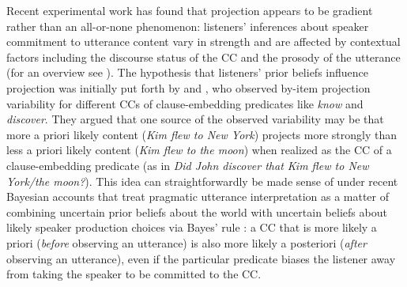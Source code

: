 \documentclass[11pt,fleqn]{article}
\newcommand{\6}{\mbox{$[\hspace*{-.6mm}[$}}
\newcommand{\9}{\mbox{$]\hspace*{-.6mm}]$}}
\begin{document}
Recent experimental work has found that projection appears to be gradient rather than an all-or-none phenomenon: listeners' inferences about speaker commitment to utterance content vary in strength and are affected by contextual factors including the discourse status of the CC and the prosody of the utterance (for an overview see ). The hypothesis that listeners' prior beliefs influence projection was initially put forth by  and , who observed by-item projection variability for different CCs of clause-embedding predicates like \emph{know} and \emph{discover}. They argued that one source of the observed variability may be that more a priori likely content ({\em Kim flew to New York}) projects more strongly than less a priori likely content  ({\em Kim flew to the moon}) when realized as the CC of a clause-embedding predicate (as in \emph{Did John discover that Kim flew to New York/the moon?}). This idea can straightforwardly be made sense of under recent Bayesian accounts that treat pragmatic utterance interpretation as a matter of combining uncertain prior beliefs about the world with uncertain beliefs about likely speaker production choices via Bayes' rule \cite{GoodmanFrank2016, degen-etal2015}: a CC that is more likely a priori (\emph{before} observing an utterance) is also more likely a posteriori (\emph{after} observing an utterance), even if the particular predicate biases the listener away from taking the speaker to be committed to the CC.


\end{document}
